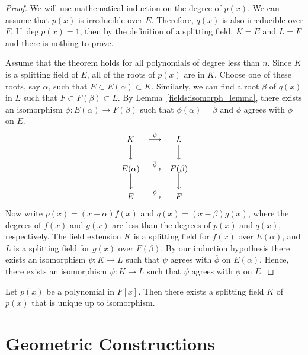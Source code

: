 \begin{proof}
We will use mathematical induction on the degree of $p(x)$. We can
assume that $p(x)$ is irreducible over $E$. Therefore, $q(x)$ is also
irreducible over $F$. If $\deg p(x) = 1$, then by the definition of a
splitting field, $K = E$ and $L = F$ and there is nothing to prove. 


Assume that the theorem holds for all polynomials of degree less than
$n$. Since $K$ is a splitting field of $E$, all of the roots of $p(x)$
are in $K$. Choose one of these roots, say $\alpha$, such that $E
\subset E( \alpha ) \subset K$. Similarly, we can find a root $\beta$
of $q(x)$ in $L$ such that $F \subset F( \beta) \subset L$. 
By Lemma~\ref{fields:isomorph_lemma}, there exists an isomorphism $\overline{\phi} : E(
\alpha ) \rightarrow F( \beta)$ such that $\overline{\phi}( \alpha ) =
\beta$  and $\overline{\phi}$ agrees with $\phi$ on $E$. 
\[
\begin{array}{ccc}
K & \stackrel{\psi}{\longrightarrow} & L \\  
\Big\downarrow & & \Big\downarrow \\
E( \alpha ) & \stackrel{\overline{\phi}}{\longrightarrow} & F( \beta ) \\
\Big\downarrow & & \Big\downarrow \\
E & \stackrel{\phi}{\longrightarrow} & F
\end{array}
\]
Now write
$p(x) = (x - \alpha ) f(x)$ and $q(x) = ( x - \beta) g(x)$, where the
degrees of $f(x)$ and $g(x)$ are less than the degrees of $p(x)$ and
$q(x)$, respectively. The field extension $K$ is a splitting field for
$f(x)$ over $E( \alpha)$, and $L$ is a splitting field for $g(x)$
over $F( \beta )$. By our induction hypothesis there exists an
isomorphism  $\psi : K \rightarrow L$ such that $\psi$ agrees with
$\overline{\phi}$ on $E( \alpha)$. Hence, there exists an isomorphism
$\psi : K \rightarrow L$ such that $\psi$ agrees with $\phi$ on $E$. 
\end{proof}


\begin{corollary}\label{fields:splitting_field_corollary}
Let $p(x)$ be a polynomial in $F[x]$. Then there exists a splitting
field $K$ of $p(x)$ that is unique up to isomorphism. 
\end{corollary}


 
\section{Geometric Constructions}


